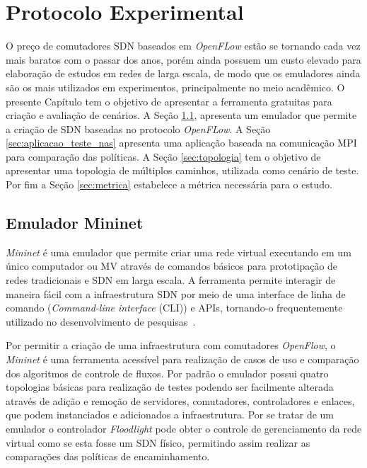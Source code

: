  \chapter{Protocolo Experimental}
 \label{cap:protocoleo_experimental}
O preço de comutadores SDN baseados em \textit{OpenFLow} estão se tornando cada vez mais baratos com o passar dos anos, porém ainda possuem um custo elevado para elaboração de estudos em redes de larga escala, de modo que os emuladores ainda são os mais utilizados em experimentos, principalmente no meio acadêmico. O presente Capítulo tem o objetivo de apresentar a ferramenta gratuitas para criação e avaliação de cenários. A Seção \ref{sec:mininet}, apresenta um emulador que permite a criação de SDN baseadas no protocolo \textit{OpenFLow}. A Seção \ref{sec:aplicacao_teste_nas} apresenta uma aplicação baseada na comunicação MPI  para comparação das políticas. A Seção  \ref{sec:topologia} tem o objetivo de apresentar uma topologia de múltiplos caminhos, utilizada como cenário de teste. Por fim a Seção \ref{sec:metrica} estabelece a métrica necessária para o estudo.
 

\section{Emulador Mininet}
\label{sec:mininet}

\textit{Mininet} é uma emulador que permite criar uma rede virtual executando em um único computador ou MV através de comandos básicos para prototipação de redes tradicionais e SDN em larga escala. A ferramenta permite interagir de maneira fácil com a infraestrutura SDN por meio de uma interface de linha de comando (\textit{Command-line interface} (CLI)) e APIs, tornando-o frequentemente utilizado no desenvolvimento de pesquisas~\cite{mininet}. %

Por permitir a criação de uma infraestrutura com comutadores \textit{OpenFlow}, o \textit{Mininet} é uma ferramenta acessível para realização de casos de uso e comparação dos algoritmos de controle de fluxos. 
Por padrão o emulador possui quatro topologias básicas para realização de testes podendo ser facilmente alterada através de adição e remoção de servidores, comutadores, controladores e enlaces, que podem instanciados e adicionados a infraestrutura. Por se tratar de um emulador o controlador \textit{Floodlight} pode obter o controle de gerenciamento da rede virtual como se esta fosse um SDN físico, permitindo assim realizar as comparações das políticas de encaminhamento. 


